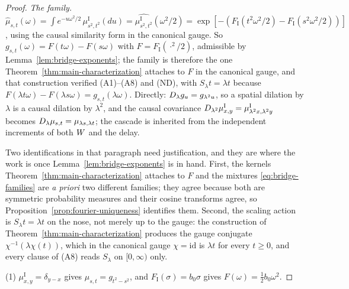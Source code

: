 \begin{proof}
\emph{The family.} $\hat\mu_{s,t}(\omega) = \int e^{-u\omega^2/2}\,\mu^{\mathrm I}_{s^2,t^2}(du)
= \widehat{\mu^{\mathrm I}_{s^2,t^2}}(\omega^2/2)
= \exp[-(F_{\mathrm I}(t^2\omega^2/2) - F_{\mathrm I}(s^2\omega^2/2))]$, using the causal
similarity form in the canonical gauge. So $g_{s,t}(\omega) = F(t\omega) - F(s\omega)$ with
$F = F_{\mathrm I}(\cdot^2/2)$, admissible by Lemma~\ref{lem:bridge-exponents}; the family is
therefore the one Theorem~\ref{thm:main-characterization} attaches to $F$ in the canonical
gauge, and that construction verified (A1)--(A8) and (ND), with $S_\lambda t = \lambda t$ because
$F(\lambda t\omega) - F(\lambda s\omega) = g_{s,t}(\lambda\omega)$. Directly:
$D_{\lambda}g_u = g_{\lambda^2u}$, so a spatial dilation by $\lambda$ is a causal dilation by
$\lambda^2$, and the causal covariance
$D_{\lambda^2}\mu^{\mathrm I}_{x,y} = \mu^{\mathrm I}_{\lambda^2x,\lambda^2y}$ becomes
$D_{\lambda}\mu_{s,t} = \mu_{\lambda s,\lambda t}$; the cascade is inherited from the
independent increments of both $W$ and the delay.

Two identifications in that paragraph need justification, and they are where the work is
once Lemma~\ref{lem:bridge-exponents} is in hand. First, the kernels
Theorem~\ref{thm:main-characterization} attaches to $F$ and the mixtures
\ref{eq:bridge-families} are \emph{a priori} two different families; they agree because both
are symmetric probability measures and their cosine transforms agree, so
Proposition~\ref{prop:fourier-uniqueness} identifies them. Second, the scaling action is
$S_\lambda t = \lambda t$ on the nose, not merely up to the gauge: the construction of
Theorem~\ref{thm:main-characterization} produces the gauge conjugate
$\chi^{-1}(\lambda\chi(t))$, which in the canonical gauge $\chi = \mathrm{id}$ is $\lambda t$
for every $t \ge 0$, and every clause of (A8) reads $S_\lambda$ on $[0,\infty)$ only.

(1) $\mu^{\mathrm I}_{x,y} = \delta_{y-x}$ gives $\mu_{s,t} = g_{t^2-s^2}$, and
$F_{\mathrm I}(\sigma) = b_0\sigma$ gives $F(\omega) = \tfrac12 b_0\omega^2$.


\end{proof}
